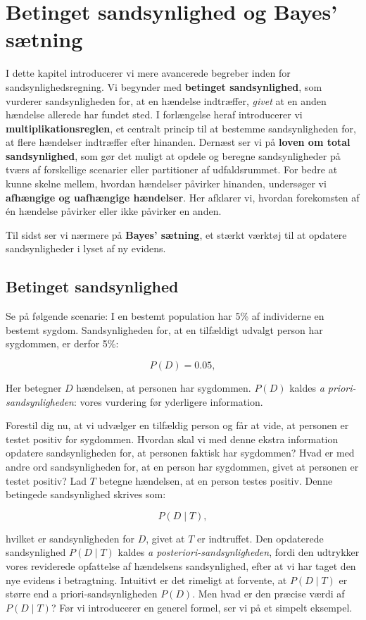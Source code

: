 \chapter{Betinget sandsynlighed og Bayes' sætning}
\label{chap:ch5}

I dette kapitel introducerer vi mere avancerede begreber inden for sandsynlighedsregning. Vi begynder med \textbf{betinget sandsynlighed}, som vurderer sandsynligheden for, at en hændelse indtræffer, \textit{givet} at en anden hændelse allerede har fundet sted. I forlængelse heraf introducerer vi \textbf{multiplikationsreglen}, et centralt princip til at bestemme sandsynligheden for, at flere hændelser indtræffer efter hinanden. Dernæst ser vi på \textbf{loven om total sandsynlighed}, som gør det muligt at opdele og beregne sandsynligheder på tværs af forskellige scenarier eller partitioner af udfaldsrummet. For bedre at kunne skelne mellem, hvordan hændelser påvirker hinanden, undersøger vi \textbf{afhængige og uafhængige hændelser}. Her afklarer vi, hvordan forekomsten af én hændelse påvirker eller ikke påvirker en anden.

Til sidst ser vi nærmere på \textbf{Bayes' sætning}, et stærkt værktøj til at opdatere sandsynligheder i lyset af ny evidens.

\section{Betinget sandsynlighed}
Se på følgende scenarie: I en bestemt population har 5\% af individerne en bestemt sygdom. Sandsynligheden for, at en tilfældigt udvalgt person har sygdommen, er derfor 5\%:

\[
P(D) = 0.05,
\]

Her betegner \( D \) hændelsen, at personen har sygdommen. \( P(D) \) kaldes \textit{a priori-sandsynligheden}: vores vurdering før yderligere information.

Forestil dig nu, at vi udvælger en tilfældig person og får at vide, at personen er testet positiv for sygdommen. Hvordan skal vi med denne ekstra information opdatere sandsynligheden for, at personen faktisk har sygdommen? Hvad er med andre ord sandsynligheden for, at en person har sygdommen, givet at personen er testet positiv? Lad \( T \) betegne hændelsen, at en person testes positiv. Denne betingede sandsynlighed skrives som:

\[
P(D \mid T),
\]

hvilket er sandsynligheden for \( D \), givet at \( T \) er indtruffet. Den opdaterede sandsynlighed \( P(D \mid T) \) kaldes \textit{a posteriori-sandsynligheden}, fordi den udtrykker vores reviderede opfattelse af hændelsens sandsynlighed, efter at vi har taget den nye evidens i betragtning. Intuitivt er det rimeligt at forvente, at \( P(D \mid T) \) er større end a priori-sandsynligheden \( P(D) \). Men hvad er den præcise værdi af \( P(D \mid T) \)? Før vi introducerer en generel formel, ser vi på et simpelt eksempel.

